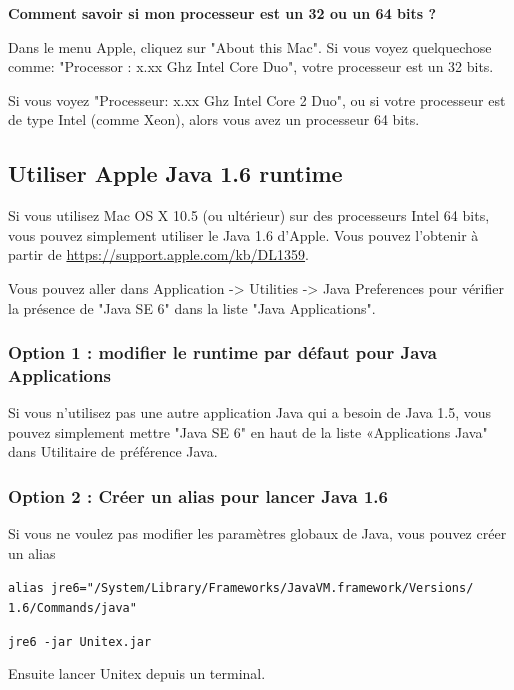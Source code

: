 \noindent\textbf{Comment savoir si mon processeur est un 32 ou un 64 bits ?}

\noindent Dans le menu Apple, cliquez sur "About this Mac". Si vous voyez quelquechose comme:
"Processor : x.xx Ghz Intel Core Duo", votre processeur est un 32 bits.

\bigskip
\noindent Si vous voyez "Processeur: x.xx Ghz Intel Core 2 Duo", ou si votre
processeur est de type Intel (comme Xeon), alors vous avez un processeur 64 bits.

\subsection{Utiliser Apple Java 1.6 runtime}
\bigskip{}
\noindent Si vous utilisez Mac OS X 10.5 (ou ultérieur) sur des processeurs Intel 64 bits, vous pouvez simplement utiliser le Java 1.6 d'Apple. Vous pouvez l'obtenir à partir de \url{https://support.apple.com/kb/DL1359}.

\noindent Vous pouvez aller dans Application -> Utilities -> Java Preferences pour vérifier la présence  de "Java SE 6" dans la liste "Java Applications".


\subsubsection{Option 1 : modifier le runtime par défaut pour Java Applications}
\noindent Si vous n'utilisez pas une autre application Java qui a besoin de Java 1.5, vous pouvez
simplement mettre "Java SE 6" en haut de la liste «Applications Java" dans Utilitaire de préférence
Java.
\subsubsection{Option 2 : Créer un alias pour lancer Java 1.6}
\noindent Si vous ne voulez pas modifier les paramètres globaux de Java, vous pouvez créer un alias

\bigskip
\noindent \verb+alias jre6="/System/Library/Frameworks/JavaVM.framework/Versions/+
\noindent \verb+1.6/Commands/java"+
   
\bigskip
\noindent \verb+jre6 -jar Unitex.jar+

\bigskip
\noindent Ensuite lancer Unitex depuis un terminal.


